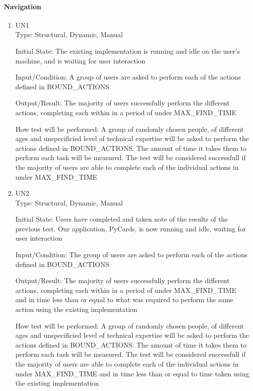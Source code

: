\documentclass[12pt, titlepage]{article}
\begin{document}
	\paragraph{Navigation}
	\begin{enumerate}
	\item{UN1\\}
		Type: Structural, Dynamic, Manual
		
		Initial State: The existing implementation is running and idle on the user's
		machine, and is waiting for user interaction
		
		Input/Condition: A group of users are asked to perform each of the actions
		defined in BOUND\_ACTIONS
		
		Output/Result: The majority of users successfully perform the different
		actions, completing each within in a period of under MAX\_FIND\_TIME
		
		How test will be performed: A group of randomly chosen people, of different
		ages and unspecificied level of technical expertise will be asked to perform
		the actions defined in BOUND\_ACTIONS. The amount of time it takes them
		to perform each task will be measured. The test will be considered successfull
		if the majority of users are able to complete each of the individual actions
		in under MAX\_FIND\_TIME	

		\item{UN2\\}
		Type: Structural, Dynamic, Manual
		
		Initial State: Users have completed and taken note of the results of the
		previous test. Our application, PyCards, is now running and idle, waiting for
		user interaction
		
		Input/Condition: The group of users are asked to perform each of the actions
		defined in BOUND\_ACTIONS
		
		Output/Result: The majority of users successfully perform the different
		actions, completing each within in a period of under MAX\_FIND\_TIME and in
		time less than or equal to what was required to perform the same action using
		the existing implementation
		
		How test will be performed: A group of randomly chosen people, of different
		ages and unspecificied level of technical expertise will be asked to perform
		the actions defined in BOUND\_ACTIONS. The amount of time it takes them
		to perform each task will be measured. The test will be considered successfull
		if the majority of users are able to complete each of the individual actions
		in under MAX\_FIND\_TIME and in time less than or equal to time taken using
		the existing implementation	
	\end{enumerate}
\end{document}
